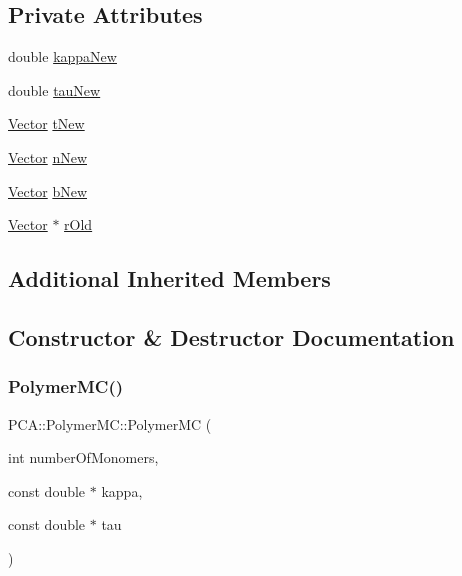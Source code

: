 \subsection*{Private Attributes}
\begin{DoxyCompactItemize}
\item 
double \hyperlink{class_p_c_a_1_1_polymer_m_c_a6771be27571e5c106546eb5225edec05}{kappa\+New}
\item 
double \hyperlink{class_p_c_a_1_1_polymer_m_c_a6400a8ec5f791281122167837d6e4d7d}{tau\+New}
\item 
\hyperlink{class_p_c_a_1_1_vector}{Vector} \hyperlink{class_p_c_a_1_1_polymer_m_c_a1220187032c23f9fd2d78886fd1815b3}{t\+New}
\item 
\hyperlink{class_p_c_a_1_1_vector}{Vector} \hyperlink{class_p_c_a_1_1_polymer_m_c_a5e493ca12a3eba2f1658ac1cccba3d56}{n\+New}
\item 
\hyperlink{class_p_c_a_1_1_vector}{Vector} \hyperlink{class_p_c_a_1_1_polymer_m_c_a69019643d3a1fd92b8c77647bb4a91d6}{b\+New}
\item 
\hyperlink{class_p_c_a_1_1_vector}{Vector} $\ast$ \hyperlink{class_p_c_a_1_1_polymer_m_c_a6144923e16ec4e3086f92516d8a9117b}{r\+Old}
\end{DoxyCompactItemize}
\subsection*{Additional Inherited Members}


\subsection{Constructor \& Destructor Documentation}
\hypertarget{class_p_c_a_1_1_polymer_m_c_a3a792caa4db0fe8a7c749c4b0f6fce25}{}\label{class_p_c_a_1_1_polymer_m_c_a3a792caa4db0fe8a7c749c4b0f6fce25} 
\subsubsection{\texorpdfstring{Polymer\+M\+C()}{PolymerMC()}}
{\footnotesize\ttfamily P\+C\+A\+::\+Polymer\+M\+C\+::\+Polymer\+MC (\begin{DoxyParamCaption}\item[{int}]{number\+Of\+Monomers,  }\item[{const double $\ast$}]{kappa,  }\item[{const double $\ast$}]{tau }\end{DoxyParamCaption})}



